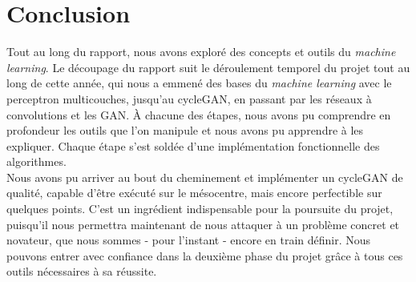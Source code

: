 \chapter*{Conclusion}


Tout au long du rapport, nous avons exploré des concepts et outils du \textit{machine learning}. Le découpage du rapport suit le déroulement temporel du projet tout au long de cette année, qui nous a emmené des bases du \textit{machine learning} avec le perceptron multicouches, jusqu’au cycleGAN, en passant par les réseaux à convolutions et les GAN. À chacune des étapes, nous avons pu comprendre en profondeur les outils que l'on manipule et nous avons pu apprendre à les expliquer. Chaque étape s'est soldée d'une implémentation fonctionnelle des algorithmes.\\
Nous avons pu arriver au bout du cheminement et implémenter un cycleGAN de qualité, capable d'être exécuté sur le mésocentre, mais encore perfectible sur quelques points. C'est un ingrédient indispensable pour la poursuite du projet, puisqu’il nous permettra maintenant de nous attaquer à un problème concret et novateur, que nous sommes - pour l'instant - encore en train définir. Nous pouvons entrer avec confiance dans la deuxième phase du projet grâce à tous ces outils nécessaires à sa réussite.